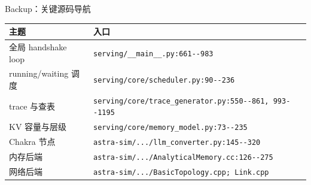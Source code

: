 \documentclass[aspectratio=169,10pt,xcolor=dvipsnames]{beamer}
\begin{document}
\begin{frame}{Backup：关键源码导航}
  \small
  \begin{tabular}{ll}
    \toprule
    主题 & 入口 \\
    \midrule
    全局 handshake loop & \nolinkurl{serving/__main__.py:661--983} \\
    running/waiting 调度 & \nolinkurl{serving/core/scheduler.py:90--236} \\
    trace 与查表 & \nolinkurl{serving/core/trace_generator.py:550--861, 993--1195} \\
    KV 容量与层级 & \nolinkurl{serving/core/memory_model.py:73--235} \\
    Chakra 节点 & \nolinkurl{astra-sim/.../llm_converter.py:145--320} \\
    内存后端 & \nolinkurl{astra-sim/.../AnalyticalMemory.cc:126--275} \\
    网络后端 & \nolinkurl{astra-sim/.../BasicTopology.cpp; Link.cpp} \\
    \bottomrule
  \end{tabular}
\end{frame}
\end{document}
